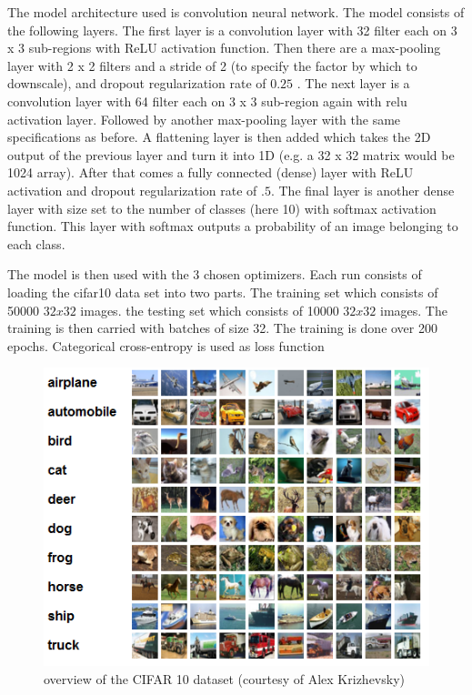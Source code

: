 \documentclass[12pt,twoside]{article}
\theoremstyle{plain}
\theoremstyle{definition}
\theoremstyle{remark}
\begin{document}
The model architecture used is convolution neural network. The model consists of the following layers. The first layer is a convolution layer with 32 filter each on 3 x 3 sub-regions with ReLU activation function. Then there are a max-pooling layer with 2 x 2 filters and a stride of 2 (to specify the factor by which to downscale), and dropout regularization rate of $0.25$  \cite{srivastava14a}. The next layer is a convolution layer with 64 filter each on 3 x 3 sub-region again with relu activation layer. Followed by another max-pooling layer with the same specifications as before. A flattening layer is then added which takes the 2D output of the previous layer and turn it into 1D (e.g. a 32 x 32 matrix would be 1024 array). After that comes a fully connected (dense) layer with ReLU activation and dropout regularization rate of $.5$. The final layer is another dense layer with size set to the number of classes (here 10) with softmax activation function. This layer with softmax outputs a probability of an image belonging to each class.

The model is then used with the 3 chosen optimizers. Each run consists of loading the cifar10 data set into two parts. The training set which consists of 50000 $32 x 32$ images. the testing set which consists of 10000 $32 x 32$ images. The training is then carried with batches of size 32. The training is done over 200 epochs. Categorical cross-entropy is used as loss function \cite{Boer2007}

\begin{figure}[H]
\centering
\includegraphics[scale=.8]{Code/cifar_preview.png}
\caption{overview of the CIFAR 10 dataset (courtesy of Alex Krizhevsky)}
\label{cifar10}
\end{figure}
\end{document}
